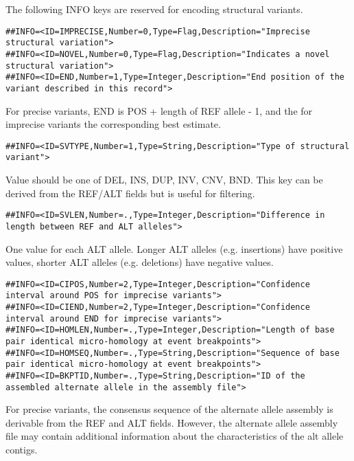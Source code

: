 \documentclass[8pt]{article}
\begin{document}
The following INFO keys are reserved for encoding structural variants.
\footnotesize
\begin{verbatim}
##INFO=<ID=IMPRECISE,Number=0,Type=Flag,Description="Imprecise structural variation">
##INFO=<ID=NOVEL,Number=0,Type=Flag,Description="Indicates a novel structural variation">
##INFO=<ID=END,Number=1,Type=Integer,Description="End position of the variant described in this record">
\end{verbatim}
\normalsize
For precise variants, END is POS + length of REF allele - 1, and the for imprecise variants the corresponding best estimate.
\footnotesize
\begin{verbatim}
##INFO=<ID=SVTYPE,Number=1,Type=String,Description="Type of structural variant">
\end{verbatim}
\normalsize
Value should be one of DEL, INS, DUP, INV, CNV, BND. This key can be derived from the REF/ALT fields but is useful for filtering.
\footnotesize
\begin{verbatim}
##INFO=<ID=SVLEN,Number=.,Type=Integer,Description="Difference in length between REF and ALT alleles">
\end{verbatim}
\normalsize
One value for each ALT allele. Longer ALT alleles (e.g. insertions) have positive values, shorter ALT alleles (e.g. deletions) have negative values.
\footnotesize
\begin{verbatim}
##INFO=<ID=CIPOS,Number=2,Type=Integer,Description="Confidence interval around POS for imprecise variants">
##INFO=<ID=CIEND,Number=2,Type=Integer,Description="Confidence interval around END for imprecise variants">
##INFO=<ID=HOMLEN,Number=.,Type=Integer,Description="Length of base pair identical micro-homology at event breakpoints">
##INFO=<ID=HOMSEQ,Number=.,Type=String,Description="Sequence of base pair identical micro-homology at event breakpoints">
##INFO=<ID=BKPTID,Number=.,Type=String,Description="ID of the assembled alternate allele in the assembly file">
\end{verbatim}
\normalsize
For precise variants, the consensus sequence of the alternate allele assembly is derivable from the REF and ALT fields. However, the alternate allele assembly file may contain additional information about the characteristics of the alt allele contigs.
\footnotesize
\end{document}
